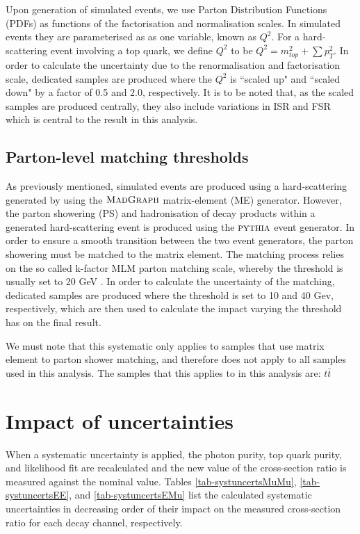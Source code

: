 Upon generation of simulated events, we use Parton Distribution Functions (PDFs) as functions of the factorisation and normalisation scales. In simulated events they are parameterised as as one variable, known as $Q^2$. For a hard-scattering event involving a top quark, we define $Q^2$ to be $Q^2 = m^2_{top} + \sum p^2_T$. In order to calculate the uncertainty due to the renormalisation and factorisation scale, dedicated samples are produced where the $Q^2$ is ``scaled up" and ``scaled down" by a factor of 0.5 and 2.0, respectively. It is to be noted that, as the scaled samples are produced centrally, they also include variations in ISR and FSR which is central to the result in this analysis.

\subsection{Parton-level matching thresholds}

As previously mentioned, simulated events are produced using a hard-scattering generated by using the $\textsc{MadGraph}$ matrix-element (ME) generator. However, the parton showering (PS) and hadronisation of decay products within a generated hard-scattering event is produced using the ${\textsc{pythia}}$ event generator. In order to ensure a smooth transition between the two event generators, the parton showering must be matched to the matrix element. The matching process relies on the so called k-factor MLM parton matching scale, whereby the threshold is usually set to 20 GeV \cite{Mangano:2006rw}. In order to calculate the uncertainty of the matching, dedicated samples are produced where the threshold is set to 10 and 40 Gev, respectively, which are then used to calculate the impact varying the threshold has on the final result.

We must note that this systematic only applies to samples that use matrix element to parton shower matching, and therefore does not apply to all samples used in this analysis. The samples that this applies to in this analysis are: $t\bar{t}$  %

\section{Impact of uncertainties}

When a systematic uncertainty is applied, the photon purity, top quark purity, and likelihood fit are recalculated and the new value of the cross-section ratio is measured against the nominal value. Tables \ref{tab-systuncertsMuMu}, \ref{tab-systuncertsEE}, and \ref{tab-systuncertsEMu} list the calculated systematic uncertainties in decreasing order of their impact on the measured cross-section ratio for each decay channel, respectively. 

